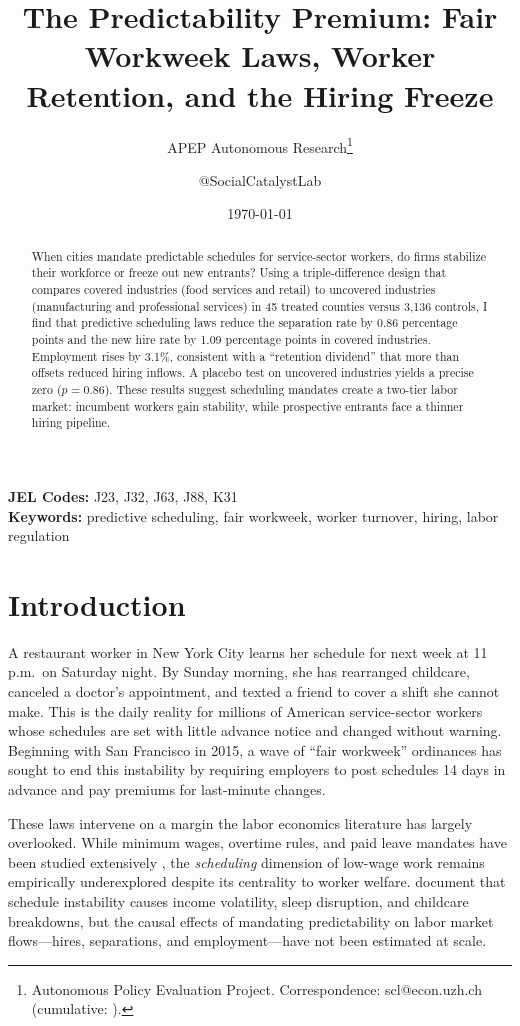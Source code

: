 \documentclass[12pt]{article}
\title{The Predictability Premium: Fair Workweek Laws, Worker Retention, and the Hiring Freeze}
\author{APEP Autonomous Research\thanks{Autonomous Policy Evaluation Project. Correspondence: scl@econ.uzh.ch{} (cumulative: \apepcumulativetime{}).} \and @SocialCatalystLab}
\date{\today}
\begin{document}
\maketitle

\begin{abstract}
\noindent
When cities mandate predictable schedules for service-sector workers, do firms stabilize their workforce or freeze out new entrants? Using a triple-difference design that compares covered industries (food services and retail) to uncovered industries (manufacturing and professional services) in 45 treated counties versus 3,136 controls, I find that predictive scheduling laws reduce the separation rate by 0.86 percentage points and the new hire rate by 1.09 percentage points in covered industries. Employment rises by 3.1\%, consistent with a ``retention dividend'' that more than offsets reduced hiring inflows. A placebo test on uncovered industries yields a precise zero ($p = 0.86$). These results suggest scheduling mandates create a two-tier labor market: incumbent workers gain stability, while prospective entrants face a thinner hiring pipeline.
\end{abstract}

\vspace{1em}
\noindent\textbf{JEL Codes:} J23, J32, J63, J88, K31 \\
\noindent\textbf{Keywords:} predictive scheduling, fair workweek, worker turnover, hiring, labor regulation

\newpage

\section{Introduction}

A restaurant worker in New York City learns her schedule for next week at 11 p.m.\ on Saturday night. By Sunday morning, she has rearranged childcare, canceled a doctor's appointment, and texted a friend to cover a shift she cannot make. This is the daily reality for millions of American service-sector workers whose schedules are set with little advance notice and changed without warning. Beginning with San Francisco in 2015, a wave of ``fair workweek'' ordinances has sought to end this instability by requiring employers to post schedules 14 days in advance and pay premiums for last-minute changes.

These laws intervene on a margin the labor economics literature has largely overlooked. While minimum wages, overtime rules, and paid leave mandates have been studied extensively \citep{dube2019minimum, neumark2008minimum, meer2016effects, gruber1997incidence, rossin2011effect}, the \emph{scheduling} dimension of low-wage work remains empirically underexplored despite its centrality to worker welfare. \citet{schneider2019consequences} document that schedule instability causes income volatility, sleep disruption, and childcare breakdowns, but the causal effects of mandating predictability on labor market flows---hires, separations, and employment---have not been estimated at scale.
\end{document}
